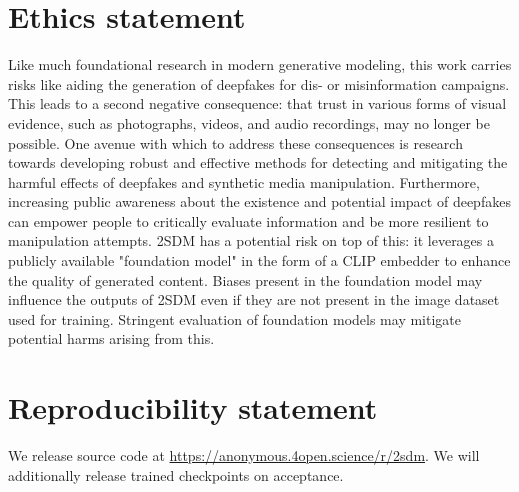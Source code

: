 \section{Ethics statement}
Like much foundational research in modern generative modeling, this work carries risks like aiding the generation of deepfakes for dis- or misinformation campaigns. This leads to a second negative consequence: that trust in various forms of visual evidence, such as photographs, videos, and audio recordings, may no longer be possible. One avenue with which to address these consequences is research towards developing robust and effective methods for detecting and mitigating the harmful effects of deepfakes and synthetic media manipulation. Furthermore, increasing public awareness about the existence and potential impact of deepfakes can empower people to critically evaluate information and be more resilient to manipulation attempts. 2SDM has a potential risk on top of this: it leverages a publicly available "foundation model" in the form of a CLIP embedder to enhance the quality of generated content. Biases present in the foundation model may influence the outputs of 2SDM even if they are not present in the image dataset used for training. Stringent evaluation of foundation models may  mitigate potential harms arising from this.

\section{Reproducibility statement}
We release source code at \url{https://anonymous.4open.science/r/2sdm}. We will additionally release trained checkpoints on acceptance.






% 
% 



